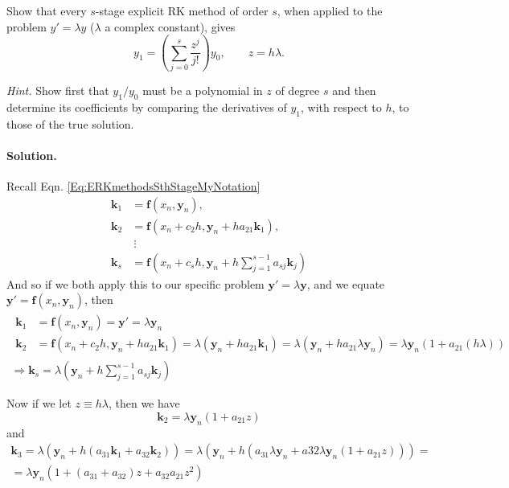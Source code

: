 \begin{exercise}
Show that every $s$-stage explicit RK method of order $s$, when applied to the
problem $y'=\lambda y$ ($\lambda$ a complex constant), gives
\[
 y_1=\left(\sum_{j=0}^{s}\frac{z^j}{j!}\right)y_0,
 \qquad z=h\lambda.
\]

\noindent\textit{Hint.} Show first that $y_1/y_0$ must be a polynomial in $z$ of
degree $s$ and then determine its coefficients by comparing the derivatives
of $y_1$, with respect to $h$, to those of the true solution.
\end{exercise}

\paragraph{Solution.}

Recall Eqn. \ref{Eq:ERKmethodsSthStageMyNotation}
\[
\begin{aligned}
       \mathbf k_1&= \mathbf f(x_n, \mathbf y_n),\\
       \mathbf k_2&= \mathbf f(x_n+c_2h, \mathbf y_n+ha_{21} \mathbf k_1),\\
      &\ \vdots\\
      \mathbf k_s&=\mathbf f\left(x_n+c_sh,
      \mathbf y_n+h\sum_{j=1}^{s-1}a_{sj} \mathbf k_j\right)
     \end{aligned}
\]
And so if we both apply this to our specific problem $\mathbf y'=\lambda \mathbf y$, and we equate $\mathbf y' = \mathbf f(x_n,\mathbf y_n)$, then
\[
\begin{gathered}
\begin{aligned}
      \mathbf k_1 & = \mathbf f(x_n, \mathbf y_n) = \mathbf y' = \lambda \mathbf y_n \\
      \mathbf k_2 & = \mathbf f(x_n+c_2h, \mathbf y_n+ha_{21} \mathbf k_1) = \lambda (\mathbf y_n+ha_{21} \mathbf k_1) = \lambda( \mathbf y_n + ha_{21} \lambda \mathbf y_n) = \lambda \mathbf y_n (1 + a_{21} (h \lambda))
\end{aligned} \\
\Longrightarrow \mathbf k_s = \lambda ( \mathbf y_n  + h \sum_{j=1}^{s- 1} a_{sj} \mathbf k_j)
\end{gathered}
\]

Now if we let $z \equiv h\lambda$, then we have
\[
      \mathbf k_2 = \lambda \mathbf y_n (1 + a_{21} z)
\]
and
\[
\begin{gathered}
      \mathbf k_3 = \lambda ( \mathbf y_n + h(a_{31} \mathbf k_1 + a_{32}\mathbf k_2)) = \lambda (\mathbf y_n + h(a_{31}\lambda \mathbf y_n + a{32} \lambda \mathbf y_n (1 + a_{21}z)  )) = \\
= \lambda  \mathbf y_n (1 + (a_{31} + a_{32})z + a_{32}a_{21} z^2)
\end{gathered}
\]

